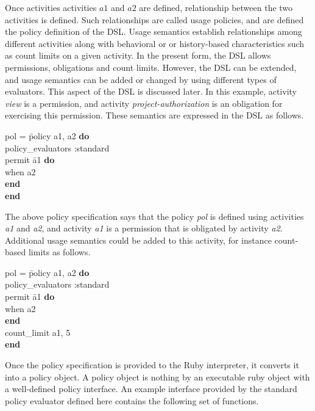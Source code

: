 Once activities activities $a1$ and $a2$ are defined, relationship between the two activities is defined. Such relationships are called usage policies, and are defined the policy definition of the DSL. Usage semantics establish relationships among different activities along with behavioral or or history-based characteristics such as count limits on a given activity. In the present form, the DSL allows permissions, obligations and count limits. However, the DSL can be extended, and usage semantics can be added or changed by using different types of evaluators. This aspect of the DSL is discussed later. In this example, activity {\em view} is a permission, and activity {\em project-authorization} is an obligation for exercising this permission. These semantics are expressed in the DSL as follows. 

\begin{tabbing}
pol = \= policy a1, a2 {\bf do} \\
\>	policy\_evaluators :standard \\
\>	permit \= a1 {\bf do} \\
\>\>		when a2 \\	
\>	{\bf end} \\
{\bf end} \\
\end{tabbing}

The above policy specification says that the policy {\em pol} is defined using activities {\em a1} and {\em a2}, and activity {\em a1} is a permission that is obligated by activity {\em a2}.  Additional usage semantics could be added to this activity, for instance count-based limits as follows. 

\begin{tabbing}
pol = \= policy a1, a2 {\bf do} \\
\>	policy\_evaluators :standard \\
\>	permit \= a1 {\bf do} \\
\>\>		when a2 \\	
\>	{\bf end} \\
\> 	count\_limit a1, 5 \\
{\bf end} \\
\end{tabbing}

Once the policy specification is provided to the Ruby interpreter, it converts it into a policy object. A policy object is nothing by an executable ruby object with a well-defined policy interface. An example interface provided by the standard policy evaluator defined here contains the following set of functions. 

